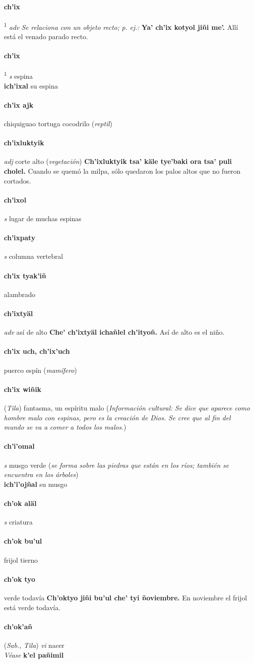 \documentclass{scrbook}
\newcommand{\entry}[1]{\paragraph{#1}}
\newcommand{\defsuperscript}[1]{\textsuperscript{1}}
\newcommand{\nontranslationdef}[1]{\textit{#1}}
\newcommand{\partofspeech}[1]{\textit{#1}}
\newcommand{\spanishtranslation}[1]{#1}
\newcommand{\clarification}[1]{(\textit{#1})}
\newcommand{\cholexample}[1]{\textbf{#1}}
\newcommand{\exampletranslation}[1]{#1}
\newcommand{\alsosee}[1]{\\\textit{Véase} \textbf{#1}}
\newcommand{\relevantdialect}[1]{(\textit{#1})}
\newcommand{\culturalinformation}[1]{(\textit{#1})}
\newcommand{\secondaryentry}[1]{\\\textbf{#1}}
\newcommand{\secondtranslation}[1]{#1}
\begin{document}
\begin{multicols}{2}
\entry{ch'ix}
\defsuperscript{1}
\partofspeech{adv}
\nontranslationdef{Se relaciona con un objeto recto; p. ej.:}
\cholexample{Ya' ch'ix kotyol jiñi me'.}
\exampletranslation{Allí está el venado parado recto.}

\entry{ch'ix}
\defsuperscript{2}
\partofspeech{s}
\spanishtranslation{espina}
\secondaryentry{ich'ixal}
\secondtranslation{su espina}

\entry{ch'ix ajk}
\spanishtranslation{chiquiguao}
\spanishtranslation{tortuga cocodrilo}
\clarification{reptil}

\entry{ch'ixluktyik}
\partofspeech{adj}
\spanishtranslation{corte alto}
\clarification{vegetación}
\cholexample{Ch'ixluktyik tsa' käle tye'baki ora tsa' puli cholel.}
\exampletranslation{Cuando se quemó la milpa, sólo quedaron los palos altos que no fueron cortados.}

\entry{ch'ixol}
\partofspeech{s}
\spanishtranslation{lugar de muchas espinas}

\entry{ch'ixpaty}
\partofspeech{s}
\spanishtranslation{columna vertebral}

\entry{ch'ix tyak'iñ}
\spanishtranslation{alambrado}

\entry{ch'ixtyäl}
\partofspeech{adv}
\spanishtranslation{así de alto}
\cholexample{Che' ch'ixtyäl ichañlel ch'ityoñ.}
\exampletranslation{Así de alto es el niño.}

\entry{ch'ix uch, ch'ix'uch}
\spanishtranslation{puerco espín}
\clarification{mamífero}

\entry{ch'ix wiñik}
\relevantdialect{Tila}
\spanishtranslation{fantasma, un espíritu malo}
\culturalinformation{Información cultural: Se dice que aparece como hombre malo con espinas, pero es la creación de Dios. Se cree que al fin del mundo se va a comer a todos los malos.}

\entry{ch'i'omal}
\partofspeech{s}
\spanishtranslation{musgo verde}
\clarification{se forma sobre las piedras que están en los ríos; también se encuentra en los árboles}
\secondaryentry{ich'i'ojñal}
\secondtranslation{su musgo}

\entry{ch'ok aläl}
\partofspeech{s}
\spanishtranslation{criatura}

\entry{ch'ok bu'ul}
\spanishtranslation{frijol tierno}

\entry{ch'ok tyo}
\spanishtranslation{verde todavía}
\cholexample{Ch'oktyo jiñi bu'ul che' tyi ñoviembre.}
\exampletranslation{En noviembre el frijol está verde todavía.}

\entry{ch'ok'añ}
\relevantdialect{Sab., Tila}
\partofspeech{vi}
\spanishtranslation{nacer}
\alsosee{k'el pañimil}


\end{multicols}
\end{document}

